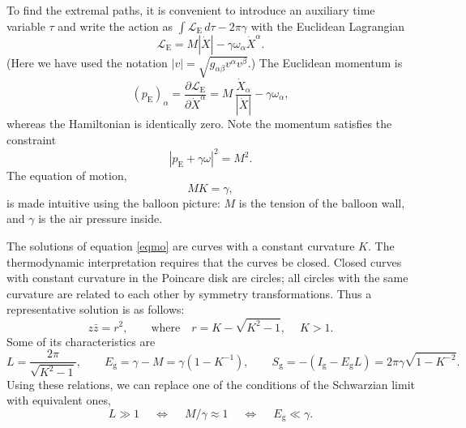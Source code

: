 \documentclass[12pt]{article}
\newcommand{\calL}{\mathcal{L}}
\newcommand{\g}{\text{g}}
\newcommand{\Euc}{\mathrm{E}}
\begin{document}
To find the extremal paths, it is convenient to introduce an auxiliary time variable $\tau$ and write the action as $\int\calL_{\Euc}\,d\tau-2\pi\gamma$ with the Euclidean Lagrangian
\begin{equation}
\calL_{\Euc}= M|\dot{X}|-\gamma\omega_{\alpha}\dot{X}^{\alpha}.
\end{equation}
(Here we have used the notation $|v|=\sqrt{g_{\alpha\beta}v^{\alpha}v^{\beta}}$.) The Euclidean momentum is
\begin{equation}
(p_{\Euc})_{\alpha}=\frac{\partial\calL_{\Euc}}{\partial\dot{X}^{\alpha}}
=M\,\frac{\dot{X}_{\alpha}}{|\dot{X}|}-\gamma\omega_{\alpha},
\end{equation}
whereas the Hamiltonian is identically zero. Note the momentum satisfies the constraint
\begin{equation}
|p_{\Euc}+\gamma\omega|^2=M^2.
\end{equation}
The equation of motion,
\begin{equation}\label{eqmo}
MK=\gamma,
\end{equation}
is made intuitive using the balloon picture: $M$ is the tension of the balloon wall, and $\gamma$ is the air pressure inside.

The solutions of equation \eqref{eqmo} are curves with a constant curvature $K$. The thermodynamic interpretation requires that the curves be closed. Closed curves with constant curvature in the Poincare disk are circles; all circles with the same curvature are related to each other by symmetry transformations. Thus a representative solution is as follows:
\begin{equation}\label{std_circle}
z\bar{z}=r^2,\qquad\text{where}\quad
r=K-\sqrt{K^2-1},\quad\: K>1.
\end{equation}
Some of its characteristics are
\begin{equation}
L=\frac{2\pi}{\sqrt{K^2-1}},\qquad E_{\g}=\gamma-M=\gamma(1-K^{-1}),\qquad
S_{\g}=-(I_{\g}-E_{\g}L)=2\pi\gamma\sqrt{1-K^{-2}}.
\end{equation}
Using these relations, we can replace one of the conditions of the Schwarzian limit with equivalent ones,
\begin{equation} \label{Schlim2}
L\gg 1 \quad\:\Leftrightarrow\quad\:
M/\gamma\approx 1 \quad\:\Leftrightarrow\quad\:
E_{\g}\ll\gamma.
\end{equation}
\end{document}
